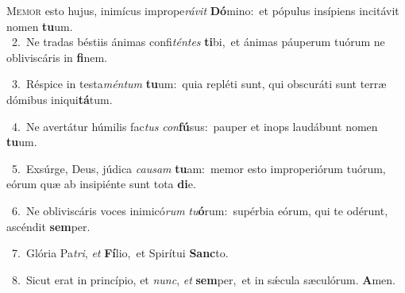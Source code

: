 \lettrine{\initial\textcolor{\initialcolor}{M}}{emor} esto hujus, inimícus imprope\-\textit{rá}\-\textit{vit} \textbf{Dó}\-mino:~\star et pópulus insípiens incitávit nomen \textbf{tu}\-um.\\
{\numbfont\textcolor{\numbcolor}{~2.}}~Ne tradas béstiis ánimas confi\-\textit{tén}\-\textit{tes} \textbf{ti}\-bi,~\star et ánimas páuperum tuórum ne obliviscáris in \textbf{fi}\-nem.\par
{\numbfont\textcolor{\numbcolor}{~3.}}~Réspice in testa\-\textit{mén}\-\textit{tum} \textbf{tu}\-um:~\star quia repléti sunt, qui obscuráti sunt terræ dómibus iniqui\-\textbf{tá}\-tum.\par
{\numbfont\textcolor{\numbcolor}{~4.}}~Ne avertátur húmilis fac\textit{tus} \textit{con}\-\textbf{fú}sus:~\star pauper et inops laudábunt nomen \textbf{tu}\-um.\par
{\numbfont\textcolor{\numbcolor}{~5.}}~Exsúrge, Deus, júdica \textit{cau}\-\textit{sam} \textbf{tu}\-am:~\star memor esto improperiórum tuórum, eórum quæ ab insipiénte sunt tota \textbf{di}\-e.\par
{\numbfont\textcolor{\numbcolor}{~6.}}~Ne obliviscáris voces inimicó\textit{rum} \textit{tu}\-\textbf{ó}rum:~\star supérbia eórum, qui te odérunt, ascéndit \textbf{sem}\-per.\par
{\numbfont\textcolor{\numbcolor}{~7.}}~Glória Pa\-\textit{tri}\-, \textit{et} \textbf{Fí}\-lio,~\star et Spirítui \textbf{Sanc}\-to.\par
{\numbfont\textcolor{\numbcolor}{~8.}}~Sicut erat in princípio, et \textit{nunc}\-, \textit{et} \textbf{sem}\-per,~\star et in sǽcula sæculórum. \textbf{A}\-men.\par
